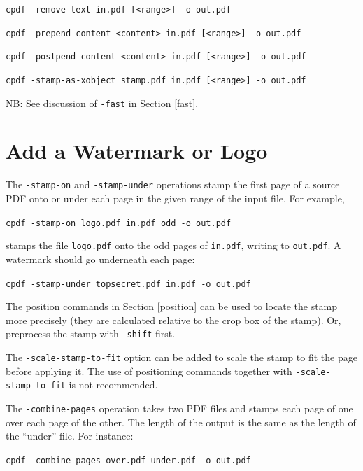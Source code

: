 \documentclass{book}
\begin{document}
\begin{framed}
  \vspace{1.5mm}
  \noindent\small\verb!cpdf -remove-text in.pdf [<range>] -o out.pdf!

  \vspace{1.5mm}
  \noindent\small\verb!cpdf -prepend-content <content> in.pdf [<range>] -o out.pdf!

  \vspace{1.5mm}
  \noindent\small\verb!cpdf -postpend-content <content> in.pdf [<range>] -o out.pdf!

  \vspace{1.5mm}
  \noindent\small\verb!cpdf -stamp-as-xobject stamp.pdf in.pdf [<range>] -o out.pdf!

  \vspace{1.5mm}
  \noindent\small NB: See discussion of \texttt{-fast} in Section \ref{fast}.
  \end{framed}

  \section{Add a Watermark or Logo}
  The \texttt{-stamp-on} and \texttt{-stamp-under} operations stamp the first
page of a source PDF onto or under each page in the given range of the input
file. For example,
  \begin{framed}
    \noindent\small\verb!cpdf -stamp-on logo.pdf in.pdf odd -o out.pdf!
  \end{framed}
\noindent stamps the file \texttt{logo.pdf} onto the odd pages of \texttt{in.pdf},
writing to \texttt{out.pdf}. A watermark should go underneath each page:
  \begin{framed}
    \noindent\small\verb!cpdf -stamp-under topsecret.pdf in.pdf -o out.pdf!
  \end{framed}

\noindent The position commands in Section \ref{position} can be used to locate the stamp more precisely (they are calculated relative to the crop box of the stamp). Or, preprocess the stamp with \texttt{-shift} first.

The \texttt{-scale-stamp-to-fit} option can be added to scale the stamp to fit the page before applying it. The use of positioning commands together with \texttt{-scale-stamp-to-fit} is not recommended.

  The \texttt{-combine-pages} operation takes two PDF files and stamps each
page of one over each page of the other. The length of the output is the same
as the length of the ``under'' file. For instance:
  \begin{framed}
    \noindent\small\verb!cpdf -combine-pages over.pdf under.pdf -o out.pdf!
  \end{framed}
\end{document}
